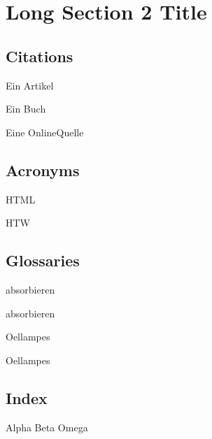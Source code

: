 \section[short section 2 title]{Long Section 2 Title}
\label{sec:section2}

\blindtext

\subsection{Citations}

Ein Artikel\autocite{article1}

Ein Buch\autocite{book1}

Eine OnlineQuelle\autocite{online1}

\subsection{Acronyms}

\gls{HTML}

\gls{HTW}

\subsection{Glossaries}

\gls{absorbieren}

\Gls{absorbieren}

\glspl{Oellampe}

\Glspl{Oellampe}

\subsection{Index}

Alpha
Beta
Omega